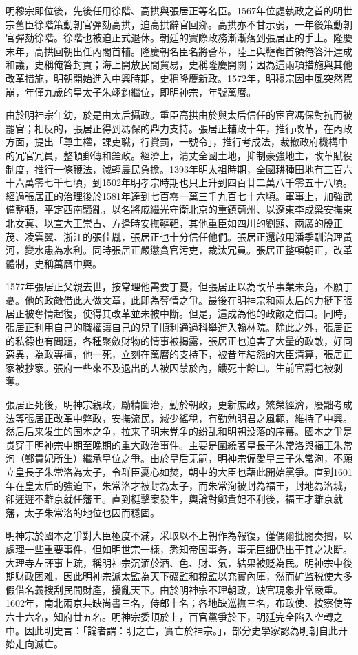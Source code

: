 明穆宗即位後，先後任用徐階、高拱與張居正等名臣。1567年位處執政之首的明世宗舊臣徐階策動朝官彈劾高拱，迫高拱辭官回鄉。高拱亦不甘示弱，一年後策動朝官彈劾徐階。徐階也被迫正式退休。朝廷的實際政務漸漸落到張居正的手上。隆慶末年，高拱回朝出任內閣首輔。隆慶朝名臣名將薈萃，陸上與韃靼首領俺答汗達成和議，史稱俺答封貢；海上開放民間貿易，史稱隆慶開關；因為這兩項措施與其他改革措施，明朝開始進入中興時期，史稱隆慶新政。1572年，明穆宗因中風突然駕崩，年僅九歲的皇太子朱翊鈞繼位，即明神宗，年號萬曆。

由於明神宗年幼，於是由太后攝政。重臣高拱由於與太后信任的宦官馮保對抗而被罷官；相反的，張居正得到馮保的鼎力支持。張居正輔政十年，推行改革，在內政方面，提出「尊主權，課吏職，行賞罰，一號令」，推行考成法，裁撤政府機構中的冗官冗員，整頓郵傳和銓政。經濟上，清丈全國土地，抑制豪強地主，改革賦役制度，推行一條鞭法，減輕農民負擔。1393年明太祖時期，全國耕種田地有三百六十六萬零七千七頃，到1502年明孝宗時期也只上升到四百廿二萬八千零五十八頃。經過張居正的治理後於1581年達到七百零一萬三千九百七十六頃。軍事上，加強武備整頓，平定西南騷亂，以名將戚繼光守衛北京的重鎮薊州、以遼東李成梁安撫東北女真、以宣大王崇古、方逢時安撫韃靼，其他重臣如四川的劉顯、兩廣的殷正茂、凌雲翼、浙江的張佳胤，張居正也十分信任他們。張居正還啟用潘季馴治理黃河，變水患為水利。同時張居正嚴懲貪官污吏，裁汰冗員。張居正整頓朝正，改革體制，史稱萬曆中興。

1577年張居正父親去世，按常理他需要丁憂，但張居正以為改革事業未竟，不願丁憂。他的政敵借此大做文章，此即為奪情之爭。最後在明神宗和兩太后的力挺下張居正被奪情起復，使得其改革並未被中斷。但是，這成為他的政敵之借口。同時，張居正利用自己的職權讓自己的兒子順利通過科舉進入翰林院。除此之外，張居正的私德也有問題，各種聚斂財物的情事被揭露，張居正也迫害了大量的政敵，好同惡異，為政專擅，他一死，立刻在萬曆的支持下，被昔年結怨的大臣清算，張居正家被抄家。張府一些來不及退出的人被囚禁於內，餓死十餘口。生前官爵也被剝奪。

張居正死後，明神宗親政，勵精圖治，勤於朝政，更新庶政，繁榮經濟，廢黜考成法等張居正改革中弊政，安撫流民，減少徭稅，有勤勉明君之風範，維持了中興。然后后来发生的国本之争，拉来了明末党争的纷乱和明朝没落的序幕。國本之爭是贯穿于明神宗中期至晚期的重大政治事件。主要是圍繞著皇長子朱常洛與福王朱常洵（鄭貴妃所生）繼承皇位之爭。由於皇后无嗣，明神宗偏愛皇三子朱常洵，不願立皇長子朱常洛為太子，令群臣憂心如焚，朝中的大臣也藉此開始黨爭。直到1601年在皇太后的強迫下，朱常洛才被封為太子，而朱常洵被封為福王，封地為洛城，卻遲遲不離京就任藩王。直到梃擊案發生，輿論對鄭貴妃不利後，福王才離京就藩，太子朱常洛的地位也因而穩固。

明神宗於國本之爭對大臣極度不滿，采取以不上朝作為報復，僅偶爾批閱奏摺，以處理一些重要事件，但如明世宗一樣，悉知帝国事务，事无巨细仍出于其之决断。大理寺左評事上疏，稱明神宗沉湎於酒、色、財、氣，結果被貶為民。明神宗中後期财政困难，因此明神宗派太監為天下礦監和稅監以充實內庫，然而矿监税使大多假借名義搜刮民間財產，擾亂天下。由於明神宗不理朝政，缺官現象非常嚴重。1602年，南北兩京共缺尚書三名，侍郎十名；各地缺巡撫三名，布政使、按察使等六十六名，知府廿五名。明神宗委頓於上，百官黨爭於下，明廷完全陷入空轉之中。因此明史言：「論者謂：明之亡，實亡於神宗。」，部分史學家認為明朝自此开始走向滅亡。

